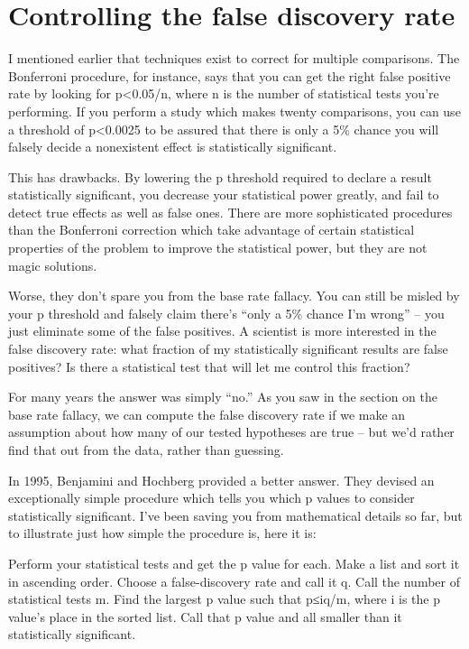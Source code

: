 \section{Controlling the false discovery rate}
\label{chp5:controlfalserate}

I mentioned earlier that techniques exist to correct for multiple comparisons. The Bonferroni procedure, for instance, says that you can get the right false positive rate by looking for p<0.05/n, where n is the number of statistical tests you’re performing. If you perform a study which makes twenty comparisons, you can use a threshold of p<0.0025 to be assured that there is only a 5\% chance you will falsely decide a nonexistent effect is statistically significant.

This has drawbacks. By lowering the p threshold required to declare a result statistically significant, you decrease your statistical power greatly, and fail to detect true effects as well as false ones. There are more sophisticated procedures than the Bonferroni correction which take advantage of certain statistical properties of the problem to improve the statistical power, but they are not magic solutions.

Worse, they don’t spare you from the base rate fallacy. You can still be misled by your p threshold and falsely claim there’s “only a 5\% chance I’m wrong” – you just eliminate some of the false positives. A scientist is more interested in the false discovery rate: what fraction of my statistically significant results are false positives? Is there a statistical test that will let me control this fraction?

For many years the answer was simply “no.” As you saw in the section on the base rate fallacy, we can compute the false discovery rate if we make an assumption about how many of our tested hypotheses are true – but we’d rather find that out from the data, rather than guessing.

In 1995, Benjamini and Hochberg provided a better answer. They devised an exceptionally simple procedure which tells you which p values to consider statistically significant. I’ve been saving you from mathematical details so far, but to illustrate just how simple the procedure is, here it is:

    Perform your statistical tests and get the p value for each. Make a list and sort it in ascending order.
    Choose a false-discovery rate and call it q. Call the number of statistical tests m.
    Find the largest p value such that p≤iq/m, where i is the p value’s place in the sorted list.
    Call that p value and all smaller than it statistically significant.

